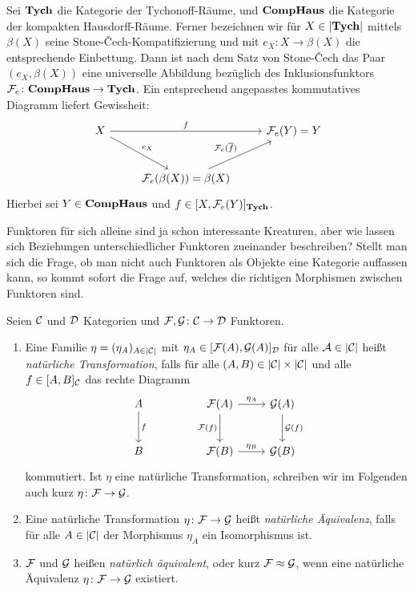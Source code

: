 \begin{ex}
       Sei $\mathbf{Tych}$ die Kategorie der Tychonoff-Räume, und $\mathbf{CompHaus}$ die Kategorie der kompakten Hausdorff-Räume.
      Ferner bezeichnen wir für $X \in |\mathbf{Tych}|$ mittels $\beta(X)$ seine Stone-\v{C}ech-Kompatifizierung und mit $e_X \colon X \to \beta(X)$ die entsprechende Einbettung. Dann ist nach dem Satz von Stone-\v{C}ech \cite[5.4.8]{bartsch} das Paar $(e_X, \beta(X))$ eine universelle Abbildung bezüglich des Inklusionsfunktors $\mathcal{F}_e \colon \mathbf{CompHaus} \to \mathbf{Tych}$.
      Ein entsprechend angepasstes kommutatives Diagramm liefert Gewissheit:
      $$
      \begin{tikzcd}[row sep=2.5em]
        X \arrow[rd,"e_X"] \arrow[rr, "f"] &&\F_e(Y) = Y \\
        &\F_e(\beta(X)) = \beta(X) \arrow[ru, "\F_e(\overline{f})"]
      \end{tikzcd}
      $$
      Hierbei sei $Y \in \mathbf{CompHaus}$ und $f \in [X, \mathcal{F}_e(Y)]_{\mathbf{Tych}}$.
\end{ex}

Funktoren für sich alleine sind ja schon interessante Kreaturen, aber wie lassen sich Beziehungen unterschiedlicher Funktoren zueinander beschreiben?
Stellt man sich die Frage, ob man nicht auch Funktoren als Objekte eine Kategorie auffassen kann, so kommt sofort die Frage auf, welches die richtigen Morphismen zwischen Funktoren sind. 

\begin{defn}
  Seien $\mathcal{C}$ und $\mathcal{D}$ Kategorien und $\mathcal{F}, \mathcal{G} \colon \mathcal{C} \to \mathcal{D}$ Funktoren.
  \begin{enumerate}[1)]
    \item Eine Familie $\eta = (\eta_A)_{A \in |\mathcal{C}|}$ mit $\eta_A \in [\mathcal{F}(A), \mathcal{G}(A)]_{\mathcal{D}}$ für alle $\mathcal{A} \in |\mathcal{C}|$ heißt \emph{natürliche Transformation}, falls für alle $(A,B) \in |\mathcal{C}| \times |\mathcal{C}|$ und alle $f \in [A,B]_{\mathcal{C}}$ das rechte Diagramm
      $$
      \begin{tikzcd}[row sep=2.5em]
        A\arrow[d,"f"] & & \F(A)\arrow[r,"\eta_A"]\arrow[d,"\F(f)"'] & \G(A)\arrow[d,"\G(f)"] \\
        B & & \F(B)\arrow[r,"\eta_B"] & \G(B)
      \end{tikzcd}
      $$
      kommutiert. Ist $\eta$ eine natürliche Transformation, schreiben wir im Folgenden auch kurz $\eta \colon \mathcal{F} \to \mathcal{G}$.
    \item Eine natürliche Transformation $\eta \colon \mathcal{F} \to \mathcal{G}$ heißt \emph{natürliche Äquivalenz}, falls für alle $A \in |\mathcal{C}|$ der Morphismus $\eta_A$ ein Isomorphismus ist.
    \item $\mathcal{F}$ und $\mathcal{G}$ heißen \emph{natürlich äquivalent}, oder kurz $\mathcal{F} \approx \mathcal{G}$, wenn eine natürliche Äquivalenz $\eta \colon \mathcal{F} \to \mathcal{G}$ existiert.
  \end{enumerate}
\end{defn}

